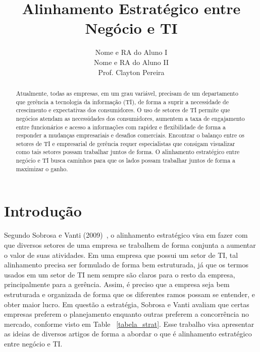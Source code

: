 \documentclass[review]{elsarticle}
\begin{document}
\begin{abstract}

Atualmente, todas as empresas, em um grau variável, precisam de um departamento que gerência a tecnologia da informação (TI), de forma a suprir a necessidade de crescimento e expectativas dos consumidores. O uso de setores de TI permite que negócios atendam as necessidades dos consumidores, aumentem a taxa de engajamento entre funcionários e acesso a informações com rapidez e flexibilidade de forma a responder a mudanças empresariais e desafios comerciais. Encontrar o balanço entre os setores de TI e empresarial de gerência requer especialistas que consigam visualizar como tais setores possam trabalhar juntos de forma. O alinhamento estratégico entre negócio e TI busca caminhos para que os lados possam trabalhar juntos de forma a maximizar o ganho.~\cite{Edmead2016,wikibit2018}


\end{abstract}

\title{Alinhamento Estratégico entre Negócio e TI}


\author{Nome e RA do Aluno I \\ Nome e RA do Aluno II \\ Prof. Clayton Pereira}%


\maketitle


\section{Introdução}
Segundo Sobrosa e Vanti (2009)~\cite{Sobrosa2009}, o alinhamento estratégico visa em fazer com que diversos setores de uma empresa se trabalhem de forma conjunta a aumentar o valor de suas atividades. Em uma empresa que possui um setor de TI, tal alinhamento precisa ser formulado de forma bem estruturada, já que os termos usados em um setor de TI nem sempre são claros para o resto da empresa, principalmente para a gerência. Assim, é preciso que a empresa seja bem estruturada e organizada de forma que os diferentes ramos possam se entender, e obter maior lucro. Em questão a estratégia, Sobrosa e Vanti avaliam que certas empresas preferem o planejamento enquanto outras preferem a concorrência no mercado, conforme visto em Table ~\ref{tabela_strat}. Esse trabalho visa apresentar as ideias de diversos artigos de forma a abordar o que é alinhamento estratégico entre negócio e TI.
\end{document}
